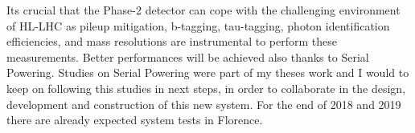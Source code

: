 \documentclass[a4paper,12pt,italian]{article}
\begin{document}
Its crucial that the Phase-2 detector can cope with the challenging environment of \mbox{HL-LHC} as pileup mitigation, b-tagging, tau-tagging, photon identification efficiencies, and mass resolutions are instrumental to perform these measurements.
Better performances will be achieved also thanks to Serial Powering. Studies on Serial Powering were part of my theses work and I would to keep on following this studies in next steps, in order to collaborate in the design, development and construction of this new system. For the end of 2018 and 2019 there are already expected system tests in Florence. %

% 
%
\end{document}
